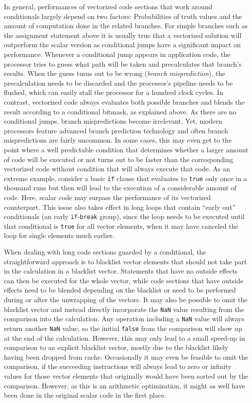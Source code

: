 In general, performances of vectorized code sections that work around conditionals largely depend on two factors: Probabilities of truth values and the amount of computation done in the related branches. For simple branches such as the assignment statement above it is usually true that a vectorized solution will outperform the scalar version as conditional jumps have a significant impact on performance. Whenever a conditional jump appears in application code, the processor tries to guess what path will be taken and precalculates that branch's results. When the guess turns out to be wrong (\emph{branch misprediction}), the precalculation needs to be discarded and the processor's pipeline needs to be flushed, which can easily stall the processor for a hundred clock cycles. In contrast, vectorized code always evaluates both possible branches and blends the result according to a conditional bitmask, as explained above. As there are no conditional jumps, branch mispredictions become irrelevant. Yet, modern processors feature advanced branch prediction technology and often branch mispredictions are fairly uncommon. In some cases, this may even get to the point where a well predictable condition that determines whether a larger amount of code will be executed or not turns out to be faster than the corresponding vectorized code without condition that will always execute that code. As an extreme example, consider a basic \texttt{if} clause that evaluates to \texttt{true} only once in a thousand runs but then will lead to the execution of a considerable amount of code. Here, scalar code may surpass the performance of its vectorized counterpart. This issue also takes effect in long loops that contain ``early out'' conditionals (\eg{}an early \texttt{if}-\texttt{break} group), since the loop needs to be executed until that conditional is \texttt{true} for all vector elements, when it may have canceled the loop for single elements much earlier.

When dealing with long code sections guarded by a conditional, the straightforward approach is to blacklist vector elements that should not take part in the calculation in a blacklist vector. Statements that have no outside effects can then be executed for the whole vector, while code sections that have outside effects need to be blended depending on the blacklist or need to be performed during or after the unwrapping of the vectors. It may also be possible to omit the blacklist vector and instead directly incorporate the \texttt{NaN} value resulting from the comparison into the calculation. Any operation including a \texttt{NaN} value will always return another \texttt{NaN} value, so the initial \texttt{false} from the comparison will show up at the end of the calculation. However, this may only lead to a small speed-up in comparison to an explicit blacklist vector, mostly due to the blacklist likely having been dropped from cache. Occasionally it may even be feasible to omit the comparison, if the succeeding instructions will always lead to zero or infinity values for those vector elements that originally would have been sorted out by the comparison. However, as this is an arithmetic optimization, it might as well have been done in the original scalar code in the first place.

